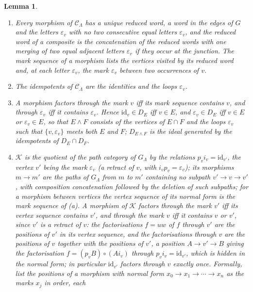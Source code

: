 \documentclass[11pt]{amsart}
\newtheorem{lem}[thm]{Lemma}
\theoremstyle{definition}
\begin{document}
\begin{lem}\label{lem:words}
\begin{enumerate}
\item[(a)] Every morphism of $\mathcal C_\Lambda$ has a unique
\emph{reduced} word, a word in the edges of $G$ and the letters
$\varepsilon_v$ with no two consecutive equal letters $\varepsilon_v$,
and the reduced word of a composite is the concatenation of the reduced
words with one merging of two equal adjacent letters $\varepsilon_v$ if
they occur at the junction. The \emph{mark sequence} of a morphism lists
the vertices visited by its reduced word and, at each letter
$\varepsilon_v$, the mark $\varepsilon_v$ between two occurrences of $v$.
\item[(b)] The idempotents of $\mathcal C_\Lambda$ are the identities and
the loops $\varepsilon_v$.
\item[(c)] A morphism factors through the mark $v$ iff its mark sequence
contains $v$, and through $\varepsilon_v$ iff it contains
$\varepsilon_v$. Hence $\mathrm{id}_v\in D_E$ iff $v\in E$, and
$\varepsilon_v\in D_E$ iff $v\in E$ or $\varepsilon_v\in E$, so that
$E\wedge F$ consists of the vertices of $E\cap F$ and the loops
$\varepsilon_v$ such that $\{v,\varepsilon_v\}$ meets both $E$ and $F$;
$D_{E\wedge F}$ is the ideal generated by the idempotents of $D_E\cap
D_F$.
\item[(d)] $\mathcal K$ is the quotient of the path category of
$G_\Lambda$ by the relations $p_vi_v=\mathrm{id}_{v'}$, the vertex $v'$
being the mark $\varepsilon_v$ (a retract of $v$, with $i_vp_v=
\varepsilon_v$); its morphisms $m\to m'$ are the paths of $G_\Lambda$
from $m$ to $m'$ containing no subpath $v'\to v\to v'$, with composition
concatenation followed by the deletion of such subpaths; for a morphism
between vertices the vertex sequence of its normal form is the mark
sequence of (a). A morphism of $\mathcal K$ factors through the mark
$v'$ iff its vertex sequence contains $v'$, and through the mark $v$ iff
it contains $v$ or $v'$, since $v'$ is a retract of $v$: the
factorisations $f=uw$ of $f$ through $v'$ are the positions of $v'$ in
its vertex sequence, and the factorisations through $v$ are the
positions of $v$ together with the positions of $v'$, a position
$A\to v'\to B$ giving the factorisation $f=(p_vB)\circ(Ai_v)$ through
$p_vi_v=\mathrm{id}_{v'}$, which is hidden in the normal form; in
particular $\mathrm{id}_{v'}$ factors through $v$ exactly once.
Formally, list the \emph{positions} of a morphism with normal form
$x_0\to x_1\to\cdots\to x_n$ as the marks $x_j$ in order, each

\end{enumerate}
\end{lem}
\end{document}
